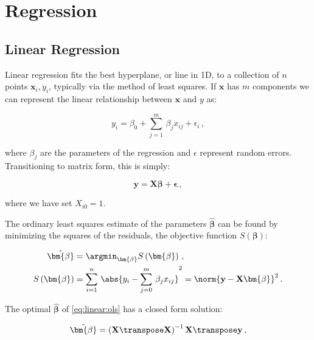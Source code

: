 \chapter{Regression}
\label{chap:regression}

\section{Linear Regression}
\label{regression:linear}

Linear regression fits the best hyperplane, or line in 1D,
to a collection of $n$ points $\mathbf{x}_{i}, y_{i}$,
typically via the method of least squares.
If $\mathbf{x}$ has $m$ components we can represent the
linear relationship between $\mathbf{x}$ and $y$ as:

\begin{equation}\label{eq:linear:onepoint}
y_{i} = \beta_{0} + \sum_{j=1}^{m}\, \beta_{j} x_{ij} + \epsilon_{i}\,,
\end{equation}

\noindent where $\beta_{j}$ are the parameters of the regression
and $\epsilon$ represent random errors.
Transitioning to matrix form, this is simply:

\begin{equation}\label{eq:linear:matrix}
\mathbf{y} = \mathbf{X} \bm{\beta} + \bm{\epsilon}\,,
\end{equation}

\noindent where we have set $X_{i0} =1$.

The ordinary least squares estimate of the parameters $\hat{\bm{\beta}}$
can be found by minimizing the squares of the residuals,
\ie the objective function $S\left(\bm{\beta}\right)$:

\begin{subequations} \label{eq:linear:ols}
\begin{align}
\hat{\bm{\beta}} &= \argmin_{\bm{\beta}} S\left(\bm{\beta}\right)\,, \label{eq:linear:argmin} \\
S\left(\bm{\beta}\right) &= \sum_{i=1}^{n} \, \abs{y_{i} - \sum_{j=0}^{m} \, \beta_{j} x_{ij}}^{2} = \norm{\mathbf{y} - \mathbf{X} \bm{\beta}}^{2}\,. \label{eq:linear:S}
\end{align}
\end{subequations}

\noindent The optimal $\hat{\bm{\beta}}$ of \cref{eq:linear:ols} has a closed form solution:

\begin{equation}\label{eq:linear:betahat}
\hat{\bm{\beta}} = \left(\mathbf{X}\transpose\mathbf{X}\right)^{-1}\mathbf{X}\transpose \mathbf{y}\,,
\end{equation}

